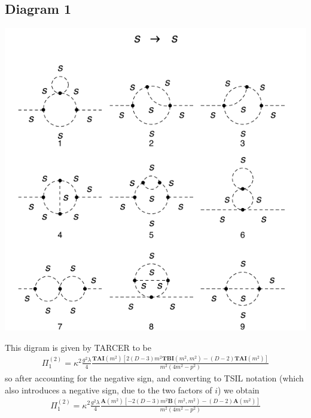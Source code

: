 \documentclass[11pt]{article}
\newcommand{\tarcer}{\textsf{TARCER} \! }
\begin{document}
\subsection*{Diagram 1}
\begin{center}
\includegraphics{2loop_1.pdf}\\
\end{center}
This digram is given by \tarcer to be
\begin{align}
\Pi^{(2)}_1 = \kappa^2\frac{g^2\lambda}{4} \frac{  \mathbf{TAI}(m^2) \left[ 2(D-3)m^2\mathbf{TBI}(m^2,m^2) - (D-2) \mathbf{TAI}(m^2) \right] }{m^2 (4m^2-p^2) }
\end{align}
so after accounting for the negative sign, and converting to TSIL notation (which also introduces a negative sign, due to the two factors of $i$) we obtain
\begin{align}
\Pi^{(2)}_1 = \kappa^2\frac{g^2\lambda}{4} \frac{  \mathbf{A}(m^2) \left[ -2(D-3)m^2\mathbf{B}(m^2,m^2) - (D-2) \mathbf{A}(m^2) \right] }{m^2 (4m^2-p^2) }
\end{align}
\end{document}
